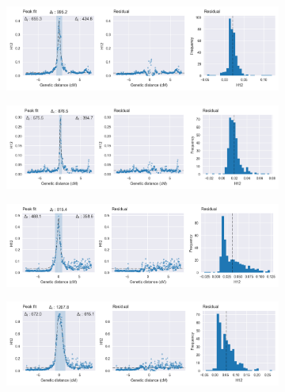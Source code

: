 \documentclass[a4paper,11pt,abstracton,hidelinks]{scrartcl}
\begin{document}
\begin{figure}[t!]
\begin{subfigure}[t]{0.32\textwidth}
    \end{subfigure}
    \hfill
    \begin{subfigure}[t]{0.32\textwidth}
        \centering
        \caption{}
        \includegraphics[width=1.1\textwidth,center,trim=0 27 380 0, clip]{artwork/chapter5/peak_fit_h12_gste_bfs.png}
    \end{subfigure}
    \begin{subfigure}[t]{0.32\textwidth}
        \centering
        \caption{}
        \includegraphics[width=1.1\textwidth,center,trim=0 27 380 0, clip]{artwork/chapter5/peak_fit_h12_gste_ugs.png}
    \end{subfigure}
    \vspace{0cm}
    \begin{subfigure}[t]{0.32\textwidth}
        \centering
        \caption{}
        \includegraphics[width=1.1\textwidth,center,trim=0 27 380 0, clip]{artwork/chapter5/peak_fit_h12_cyp9k1_bfs.png}
    \end{subfigure}
    \hfill
    \begin{subfigure}[t]{0.32\textwidth}
        \centering
        \caption{}
        \includegraphics[width=1.1\textwidth,center,trim=0 27 380 0, clip]{artwork/chapter5/peak_fit_h12_cyp9k1_bfm.png}

\end{subfigure}
\end{figure}
\end{document}
